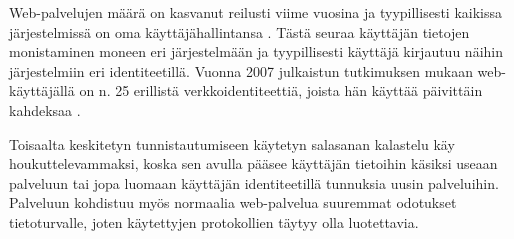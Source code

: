 Web-palvelujen määrä on kasvanut reilusti viime vuosina ja tyypillisesti kaikissa järjestelmissä on oma käyttäjähallintansa \cite{billion_keys}. Tästä seuraa käyttäjän tietojen monistaminen moneen eri järjestelmään ja tyypillisesti käyttäjä kirjautuu näihin järjestelmiin eri identiteetillä. Vuonna 2007 julkaistun tutkimuksen mukaan web-käyttäjällä on n. 25 erillistä verkkoidentiteettiä, joista hän käyttää päivittäin kahdeksaa \cite{password_habits}.

Toisaalta keskitetyn tunnistautumiseen käytetyn salasanan kalastelu käy houkuttelevammaksi, koska sen avulla pääsee käyttäjän tietoihin käsiksi useaan palveluun tai jopa luomaan käyttäjän identiteetillä tunnuksia uusin palveluihin. Palveluun kohdistuu myös normaalia web-palvelua suuremmat odotukset tietoturvalle, joten käytettyjen protokollien täytyy olla luotettavia.
